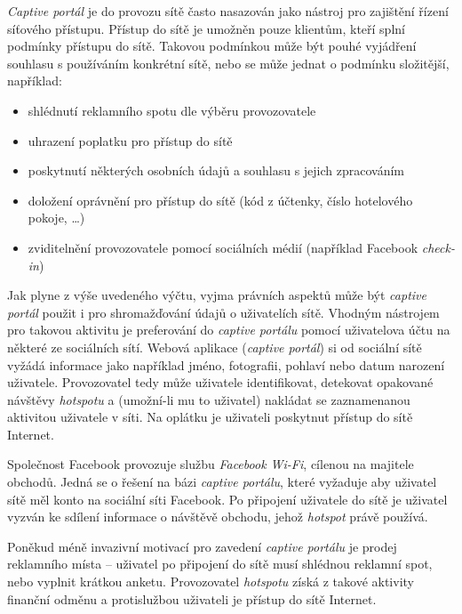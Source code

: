 \documentclass[thesis=M,czech]{FITthesis}[2012/10/20]
\begin{document}
\textit{Captive portál} je do provozu sítě často nasazován jako nástroj pro zajištění řízení síťového přístupu. Přístup do sítě je umožněn pouze klientům, kteří splní podmínky přístupu do sítě. Takovou podmínkou může být pouhé vyjádření souhlasu s používáním konkrétní sítě, nebo se může jednat o podmínku složitější, například:

\begin{itemize}
 \item shlédnutí reklamního spotu dle výběru provozovatele
 \item uhrazení poplatku pro přístup do sítě
 \item poskytnutí některých osobních údajů a souhlasu s jejich zpracováním
 \item doložení oprávnění pro přístup do sítě (kód z účtenky, číslo hotelového pokoje, \ldots)
 \item zviditelnění provozovatele pomocí sociálních médií (například Facebook \textit{check-in})
\end{itemize}

Jak plyne z výše uvedeného výčtu, vyjma právních aspektů může být \textit{captive portál} použit i pro shromažďování údajů o uživatelích sítě. Vhodným nástrojem pro takovou aktivitu je preferování  do \textit{captive portálu} pomocí uživatelova účtu na některé ze sociálních sítí. Webová aplikace (\textit{captive portál}) si od sociální sítě vyžádá informace jako například jméno, fotografii, pohlaví nebo datum narození uživatele. Provozovatel tedy může uživatele identifikovat, detekovat opakované návštěvy \textit{hotspotu} a (umožní-li mu to uživatel) nakládat se zaznamenanou aktivitou uživatele v síti. Na oplátku je uživateli  poskytnut přístup do sítě Internet.


Společnost Facebook provozuje\cite{facebook_wifi} službu \textit{Facebook Wi-Fi}, cílenou na majitele obchodů. Jedná se o řešení na bázi \textit{captive portálu}, které vyžaduje aby uživatel sítě měl konto na sociální síti Facebook. Po připojení uživatele do sítě je uživatel vyzván ke sdílení informace o návštěvě obchodu, jehož \textit{hotspot} právě používá.

Poněkud méně invazivní motivací pro zavedení \textit{captive portálu} je prodej reklamního místa -- uživatel po připojení do sítě musí shlédnou reklamní spot, nebo vyplnit krátkou anketu. Provozovatel \textit{hotspotu} získá z takové aktivity finanční odměnu a protislužbou uživateli je přístup do sítě Internet.
\end{document}
